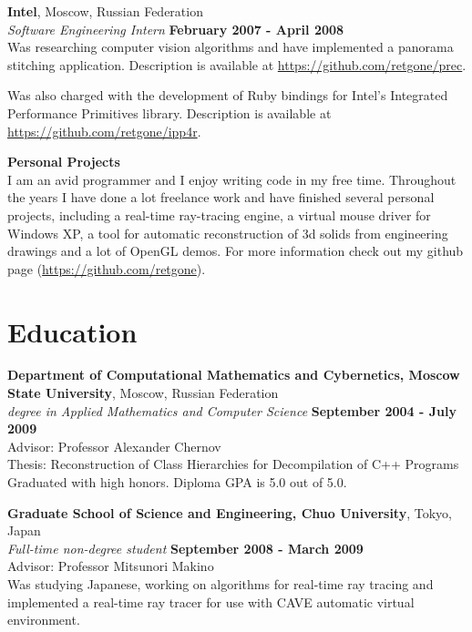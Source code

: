 \documentclass[margin,line]{CV}
\begin{document}
\begin{resume}
   
    \textbf{Intel}, Moscow, Russian Federation \vspace{2mm}\\\vspace{1mm}%
    \textsl{Software Engineering Intern} \hfill \textbf{February 2007 - April 2008}\\
    Was researching computer vision algorithms and have implemented a panorama stitching application. Description is available at \url{https://github.com/retgone/prec}.

    Was also charged with the development of Ruby bindings for Intel's Integrated Performance Primitives library. Description is available at \url{https://github.com/retgone/ipp4r}.
    
    
    \textbf{Personal Projects} \vspace{2mm}\\\vspace{1mm}%
    I am an avid programmer and I enjoy writing code in my free time. Throughout the years I have done a lot freelance work and have finished several personal projects, including a real-time ray-tracing engine, a virtual mouse driver for Windows XP, a tool for automatic reconstruction of 3d solids from engineering drawings and a lot of OpenGL demos. For more information check out my github page (\url{https://github.com/retgone}).
   
   
    \pagebreak    
   
   
    \section{\mysidestyle Education}
    \textbf{Department of Computational Mathematics and Cybernetics, Moscow State University}, Moscow, Russian Federation \vspace{2mm}\\\vspace{1mm}%
    \textsl{ degree in Applied Mathematics and Computer Science} \hfill \textbf{September 2004 - July 2009}\vspace{1mm}\\
    Advisor: Professor Alexander Chernov \\
    Thesis: Reconstruction of Class Hierarchies for Decompilation of C++ Programs \\
    Graduated with high honors. Diploma GPA is 5.0 out of 5.0.

    \textbf{Graduate School of Science and Engineering, Chuo University}, Tokyo, Japan \vspace{2mm}\\\vspace{1mm}%
    \textsl{Full-time non-degree student} \hfill \textbf{September 2008 - March 2009}\vspace{1mm}\\
    Advisor: Professor Mitsunori Makino \\
    Was studying Japanese, working on algorithms for real-time ray tracing and implemented a real-time ray tracer for use with CAVE automatic virtual environment.


\end{resume}
\end{document}
